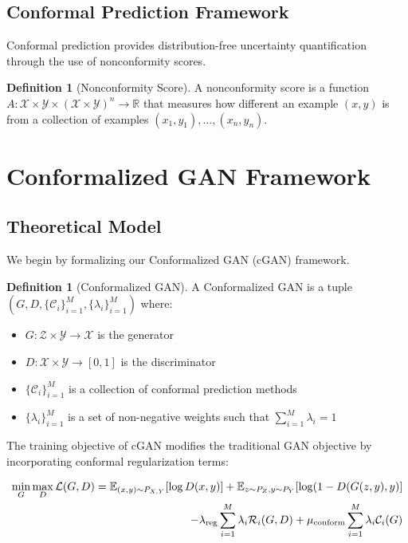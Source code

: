 \documentclass{article}
\theoremstyle{plain}
\theoremstyle{definition}
\newtheorem{definition}[theorem]{Definition}
\theoremstyle{remark}
\begin{document}
\subsection{Conformal Prediction Framework}
Conformal prediction provides distribution-free uncertainty quantification through the use of nonconformity scores.

\begin{definition}[Nonconformity Score]
A nonconformity score is a function $A: \mathcal{X} \times \mathcal{Y} \times (\mathcal{X} \times \mathcal{Y})^n \rightarrow \mathbb{R}$ that measures how different an example $(x, y)$ is from a collection of examples $(x_1, y_1), \ldots, (x_n, y_n)$.
\end{definition}

\section{Conformalized GAN Framework}

\subsection{Theoretical Model}
We begin by formalizing our Conformalized GAN (cGAN) framework.

\begin{definition}[Conformalized GAN]
A Conformalized GAN is a tuple $(G, D, \{\mathcal{C}_i\}_{i=1}^M, \{\lambda_i\}_{i=1}^M)$ where:
\begin{itemize}
    \item $G: \mathcal{Z} \times \mathcal{Y} \rightarrow \mathcal{X}$ is the generator
    \item $D: \mathcal{X} \times \mathcal{Y} \rightarrow [0, 1]$ is the discriminator
    \item $\{\mathcal{C}_i\}_{i=1}^M$ is a collection of conformal prediction methods
    \item $\{\lambda_i\}_{i=1}^M$ is a set of non-negative weights such that $\sum_{i=1}^M \lambda_i = 1$
\end{itemize}
\end{definition}

The training objective of cGAN modifies the traditional GAN objective by incorporating conformal regularization terms:

\begin{align}
\min_G \max_D \mathcal{L}(G, D) = \mathbb{E}_{(x,y) \sim P_{X,Y}}[\log D(x, y)] + \mathbb{E}_{z \sim P_Z, y \sim P_Y}[\log(1 - D(G(z, y), y)] \notag\\
- \lambda_{\text{reg}} \sum_{i=1}^M \lambda_i \mathcal{R}_i(G, D) + \mu_{\text{conform}} \sum_{i=1}^M \lambda_i \mathcal{C}_i(G)
\end{align}
\end{document}
